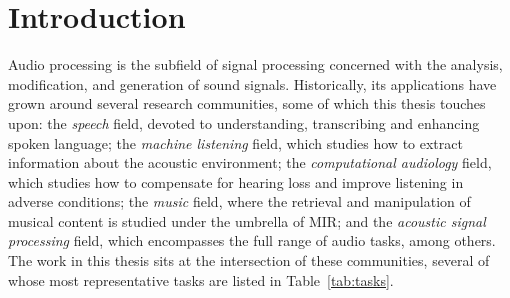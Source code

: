 


\chapter{Introduction}
\label{ch01_intro}




Audio processing is the subfield of signal processing concerned with the
analysis, modification, and generation of sound signals. Historically, its
applications have grown around several research communities, some of which this thesis touches upon: the \emph{speech} field, devoted to understanding, transcribing and enhancing spoken language; the \emph{machine listening} field, which studies how to extract information about the acoustic environment; the \emph{computational audiology} field, which studies how to compensate for hearing loss and improve listening in adverse conditions; the \emph{music} field, where the retrieval and manipulation of musical content is studied under the umbrella of \acrfull{MIR}; and the \emph{acoustic signal processing} field, which encompasses the full range of audio tasks, among others. The work in this thesis sits at the intersection of these communities, several of whose most representative tasks are listed in Table~\ref{tab:tasks}.

